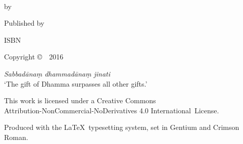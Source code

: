 \cleartoverso
\thispagestyle{empty}

{\copyrightsize
\centering
\setlength{\parindent}{0pt}%
\setlength{\parskip}{0.8\baselineskip}%

\thetitle\\
by \theauthor

Published by \thePublisher

ISBN \theISBN

Copyright \copyright\ \thePublisher\ 2016

\vfill

{\footnotesize

\textit{Sabbadānaṃ dhammadānaṃ jinati}\\
‘The gift of Dhamma surpasses all other gifts.’

This work is licensed under a Creative Commons\\
Attribution-NonCommercial-NoDerivatives 4.0 International~License.

Produced with the \LaTeX\ typesetting system, set in Gentium and Crimson Roman.

\theEditionInfo

}}

%
%
%
%
%
%
%
%
%
%
%
%
%
%
